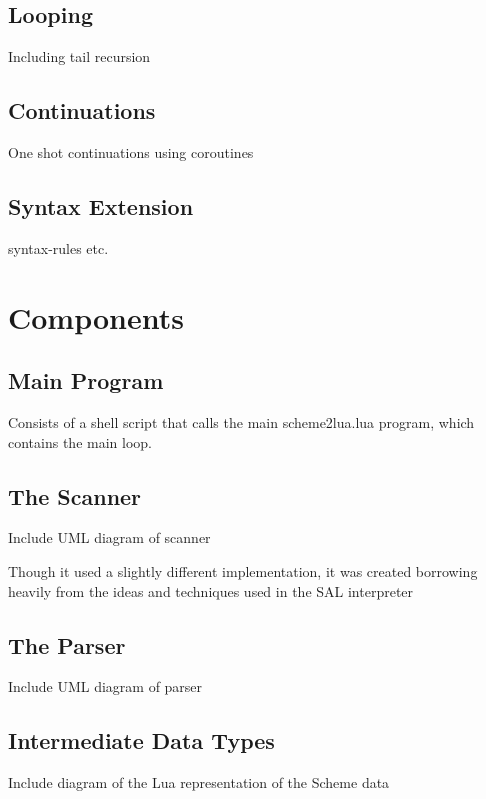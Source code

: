 \subsection{Looping}

Including tail recursion

\subsection{Continuations}

One shot continuations using coroutines

\subsection{Syntax Extension}

syntax-rules etc.


\section{Components}

\subsection{Main Program}

Consists of a shell script that calls the main scheme2lua.lua program, which
contains the main loop.

\subsection{The Scanner}

Include UML diagram of scanner

Though it used a slightly different implementation, it was created borrowing
heavily from the ideas and techniques used in the SAL interpreter~\cite{sal}

\subsection{The Parser}

Include UML diagram of parser

\subsection{Intermediate Data Types}

Include diagram of the Lua representation of the Scheme data 

